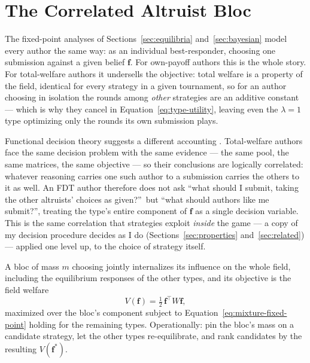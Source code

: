 \section{The Correlated Altruist Bloc}
\label{sec:bayesian-bloc}

The fixed-point analyses of Sections~\ref{sec:equilibria}
and~\ref{sec:bayesian} model every author the same way: as an
individual best-responder, choosing one submission against a given
belief $\mathbf{f}$.
For own-payoff authors this is the whole story.
For total-welfare authors it undersells the objective: total welfare
is a property of the field, identical for every strategy in a given
tournament, so for an author choosing in isolation the rounds among
\emph{other} strategies are an additive constant --- which is why
they cancel in Equation~\eqref{eq:type-utility}, leaving even the
$\lambda = 1$ type optimizing only the rounds its own submission
plays.

Functional decision theory suggests a different accounting
\citep{yudkowsky2017functional}.
Total-welfare authors face the same decision problem with the same
evidence --- the same pool, the same matrices, the same objective ---
so their conclusions are logically correlated: whatever reasoning
carries one such author to a submission carries the others to it as
well.
An FDT author therefore does not ask ``what should I submit, taking
the other altruists' choices as given?''\ but ``what should authors
like me submit?'', treating the type's entire component of
$\mathbf{f}$ as a single decision variable.
This is the same correlation that strategies exploit \emph{inside}
the game --- a copy of my decision procedure decides as I do
(Sections~\ref{sec:properties} and~\ref{sec:related}) --- applied
one level up, to the choice of strategy itself.

A bloc of mass $m$ choosing jointly internalizes its influence on
the whole field, including the equilibrium responses of the other
types, and its objective is the field welfare
\begin{equation}
  V(\mathbf{f}) = \tfrac{1}{2}\, \mathbf{f}^\top W \mathbf{f},
  \label{eq:field-welfare}
\end{equation}
maximized over the bloc's component subject to
Equation~\eqref{eq:mixture-fixed-point} holding for the remaining
types.
Operationally: pin the bloc's mass on a candidate strategy, let the
other types re-equilibrate, and rank candidates by the resulting
$V(\mathbf{f}^*)$.

